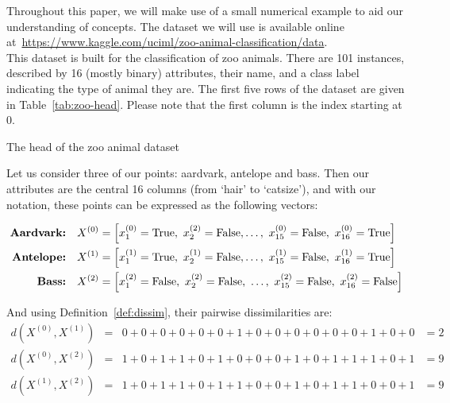 \begin{example}\label{ex:dissim}
    Throughout this paper, we will make use of a small numerical example to aid 
    our understanding of concepts. The dataset we will use is available online 
    at~\url{https://www.kaggle.com/uciml/zoo-animal-classification/data}.\\

    This dataset is built for the classification of zoo animals. There are 101
    instances, described by 16 (mostly binary) attributes, their name, and a 
    class label indicating the type of animal they are. The first five rows of 
    the dataset are given in Table~\ref{tab:zoo-head}. Please note that the
    first column is the index starting at \(0\).\\
    
    \begin{table}[h]
    \resizebox{\textwidth}{!}{%
        \centering
        
    }
    \caption{The head of the zoo animal dataset}\label{tab:zoo-head}
    \end{table}

    Let us consider three of our points: aardvark, antelope and bass. Then our
    attributes are the central 16 columns (from `hair' to `catsize'), and with 
    our notation, these points can be expressed as the following vectors:

    \begin{equation}
    \nonumber
    \begin{aligned}
        \textbf{Aardvark:} \quad & X^{(0)} = \left[x_1^{(0)} = \true, \ 
            x_2^{(2)} = \false, \ldots, \ x_{15}^{(0)} = \false, \ x_{16}^{(0)} 
            = \true\right]
        \\
        \textbf{Antelope:} \quad & X^{(1)} = \left[x_1^{(1)} = \true, \
            x_2^{(1)} = \false, \ldots, \ x_{15}^{(1)} = \false, \ x_{16}^{(1)} 
            = \true\right]
        \\
        \textbf{Bass:} \quad & X^{(2)} = \left[x_1^{(2)} = \false, \ x_2^{(2)} = 
            \false, \ \ldots, \ x_{15}^{(2)} = \false, \ x_{16}^{(2)} = 
            \false\right]
        \\
    \end{aligned}
    \end{equation}

    And using Definition~\ref{def:dissim}, their pairwise dissimilarities are:
    \begin{equation}
    \nonumber
    \begin{aligned}
        d(X^{(0)}, X^{(1)}) & = & 0 + 0 + 0 + 0 + 0 + 0 + 1 + 0 + 0 + 0 + 0 + 0 
        + 0 + 1 + 0 + 0 & = 2
        \\
        d(X^{(0)}, X^{(2)}) & = & 1 + 0 + 1 + 1 + 0 + 1 + 0 + 0 + 0 + 1 + 0 + 1 
        + 1 + 1 + 0 + 1 & = 9
        \\
        d(X^{(1)}, X^{(2)}) & = & 1 + 0 + 1 + 1 + 0 + 1 + 1 + 0 + 0 + 1 + 0 + 1
        + 1 + 0 + 0 + 1 & = 9
        \\
    \end{aligned}
    \end{equation}
    \\
\end{example}

